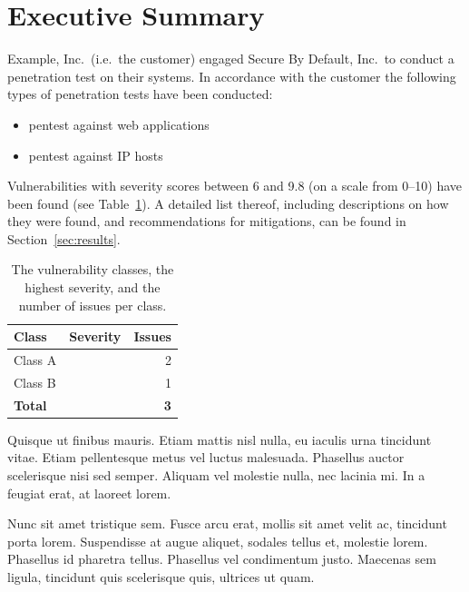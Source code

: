 \documentclass[a4paper]{article}
\newcommand{\minmalseveritygaugeH}[2][1]{
  \begin{tikzpicture}[scale=#1, baseline=-0.5ex]
    \filldraw[fill=white, draw=black] (0, -0.3) rectangle (10, 0.3);
    \filldraw[fill=black, draw=black] (0, -0.3) rectangle (#2, 0.3);
  \end{tikzpicture}
}
\begin{document}
\clearpage
\section*{Executive Summary}

Example, Inc.\ (i.e.\ the customer) engaged Secure By Default, Inc.\ to conduct a penetration test on their systems.
In accordance with the customer the following types of penetration tests have been conducted:

\begin{itemize}
      \item pentest against web applications

      \item pentest against IP hosts

  \end{itemize}

Vulnerabilities with severity scores between 6 and 9.8 (on a scale from 0--10) have been found (see Table~\ref{tab:vulnerabilities}).
A detailed list thereof, including descriptions on how they were found, and recommendations for mitigations, can be found in Section~\ref{sec:results}.

\begin{table}[h!]
  \centering
  \caption{The vulnerability classes, the highest severity, and the number of issues per class.}
  \label{tab:vulnerabilities}
  \begin{tabular}{lcr}
    \textbf{Class} & \textbf{Severity} & \textbf{Issues} \\
    \hline
          Class A & \minmalseveritygaugeH[0.2]{9.8} & 2 \\
          Class B & \minmalseveritygaugeH[0.2]{6} & 1 \\
        \hline
    \textbf{Total} & ~ & \textbf{3}
  \end{tabular}
\end{table}

Quisque ut finibus mauris.
Etiam mattis nisl nulla, eu iaculis urna tincidunt vitae.
Etiam pellentesque metus vel luctus malesuada.
Phasellus auctor scelerisque nisi sed semper.
Aliquam vel molestie nulla, nec lacinia mi.
In a feugiat erat, at laoreet lorem.

Nunc sit amet tristique sem.
Fusce arcu erat, mollis sit amet velit ac, tincidunt porta lorem.
Suspendisse at augue aliquet, sodales tellus et, molestie lorem.
Phasellus id pharetra tellus.
Phasellus vel condimentum justo.
Maecenas sem ligula, tincidunt quis scelerisque quis, ultrices ut quam.
\end{document}
